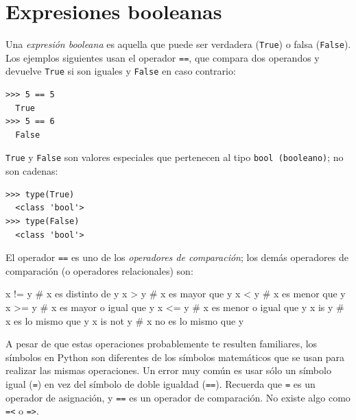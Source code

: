 

\hypertarget{expresiones-booleanas}{%
\section{Expresiones booleanas}\label{expresiones-booleanas}}

 
 

Una \emph{expresión booleana} es aquella que puede ser verdadera
(\texttt{True}) o falsa (\texttt{False}). Los ejemplos siguientes usan
el operador \texttt{==}, que compara dos operandos y devuelve
\texttt{True} si son iguales y \texttt{False} en caso contrario:

\begin{Verbatim}[frame=single]
>>> 5 == 5
  True
>>> 5 == 6
  False
\end{Verbatim}

\texttt{True} y \texttt{False} son valores especiales que pertenecen al
tipo \texttt{bool\ (booleano)}; no son cadenas:

 
 
 

\begin{Verbatim}[frame=single]
>>> type(True)
  <class 'bool'>
>>> type(False)
  <class 'bool'>
\end{Verbatim}

El operador \texttt{==} es uno de los \emph{operadores de comparación}; los demás operadores de comparación (o operadores relacionales) son:

\begin{python}[frame=single]
x != y               # x es distinto de y
x > y                # x es mayor que y
x < y                # x es menor que y
x >= y               # x es mayor o igual que y
x <= y               # x es menor o igual que y
x is y               # x es lo mismo que y
x is not y           # x no es lo mismo que y
\end{python}

A pesar de que estas operaciones probablemente te resulten familiares,
los símbolos en Python son diferentes de los símbolos matemáticos que se
usan para realizar las mismas operaciones. Un error muy común es usar
sólo un símbolo igual (\texttt{=}) en vez del símbolo de doble igualdad
(\texttt{==}). Recuerda que \texttt{=} es un operador de asignación, y
\texttt{==} es un operador de comparación. No existe algo como
\texttt{=\textless{}} o \texttt{=\textgreater{}}.

